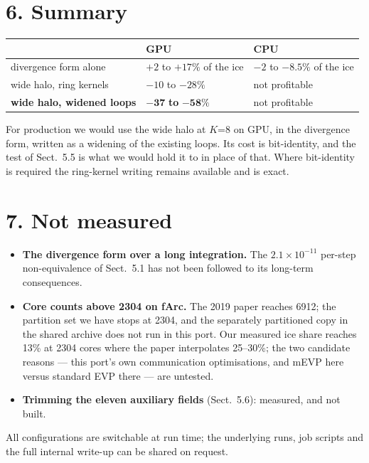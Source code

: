 \documentclass[11pt,a4paper]{article}
\begin{document}
\section*{6. Summary}

\begin{center}\small
\begin{tabular}{@{}lll@{}}
\toprule
& \textbf{GPU} & \textbf{CPU} \\
\midrule
divergence form alone & $+2$ to $+17\%$ of the ice & $-2$ to $-8.5\%$ of the ice \\
wide halo, ring kernels & $-10$ to $-28\%$ & not profitable \\
\textbf{wide halo, widened loops} & $\mathbf{-37}$ \textbf{to} $\mathbf{-58\%}$ & not profitable \\
\bottomrule
\end{tabular}
\end{center}

For production we would use the wide halo at $K$=8 on GPU, in the divergence form, written as a
widening of the existing loops. Its cost is bit-identity, and the test of Sect.~5.5 is what we
would hold it to in place of that. Where bit-identity is required the ring-kernel writing remains
available and is exact.

\section*{7. Not measured}

\begin{itemize}\itemsep0.12em
\item \textbf{The divergence form over a long integration.} The $2.1\times10^{-11}$ per-step
non-equivalence of Sect.~5.1 has not been followed to its long-term consequences.
\item \textbf{Core counts above 2304 on fArc.} The 2019 paper reaches 6912; the partition set we
have stops at 2304, and the separately partitioned copy in the shared archive does not run in this
port. Our measured ice share reaches 13\% at 2304 cores where the paper interpolates 25--30\%; the
two candidate reasons --- this port's own communication optimisations, and mEVP here versus
standard EVP there --- are untested.
\item \textbf{Trimming the eleven auxiliary fields} (Sect.~5.6): measured, and not built.
\end{itemize}

\vspace{0.5em}
{\footnotesize All configurations are switchable at run time; the underlying runs, job scripts and
the full internal write-up can be shared on request.}
\end{document}
